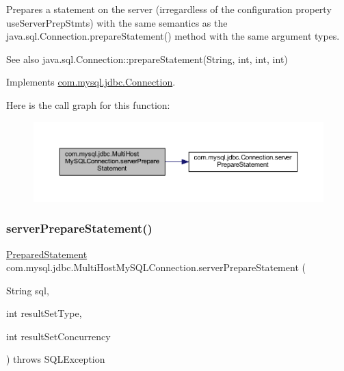 Prepares a statement on the server (irregardless of the configuration property \textquotesingle{}use\+Server\+Prep\+Stmts\textquotesingle{}) with the same semantics as the java.\+sql.\+Connection.\+prepare\+Statement() method with the same argument types.

\begin{DoxySeeAlso}{See also}
java.\+sql.\+Connection\+::prepare\+Statement(\+String, int, int, int) 
\end{DoxySeeAlso}


Implements \mbox{\hyperlink{interfacecom_1_1mysql_1_1jdbc_1_1_connection_aa815a139c20cb2ecb32bc50fca219c6e}{com.\+mysql.\+jdbc.\+Connection}}.

Here is the call graph for this function\+:
\nopagebreak
\begin{figure}[H]
\begin{center}
\leavevmode
\includegraphics[width=350pt]{classcom_1_1mysql_1_1jdbc_1_1_multi_host_my_s_q_l_connection_ac7585cb7791fb3f439f1dec002b9486e_cgraph}
\end{center}
\end{figure}
\mbox{\label{classcom_1_1mysql_1_1jdbc_1_1_multi_host_my_s_q_l_connection_a6327530074443cc7c221a1323f871b65}} 
\subsubsection{\texorpdfstring{server\+Prepare\+Statement()}{serverPrepareStatement()}\hspace{0.1cm}{\footnotesize\ttfamily [2/6]}}
{\footnotesize\ttfamily \mbox{\hyperlink{classcom_1_1mysql_1_1jdbc_1_1_prepared_statement}{Prepared\+Statement}} com.\+mysql.\+jdbc.\+Multi\+Host\+My\+S\+Q\+L\+Connection.\+server\+Prepare\+Statement (\begin{DoxyParamCaption}\item[{String}]{sql,  }\item[{int}]{result\+Set\+Type,  }\item[{int}]{result\+Set\+Concurrency }\end{DoxyParamCaption}) throws S\+Q\+L\+Exception}

